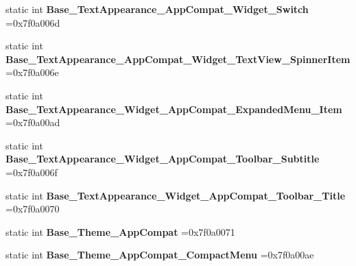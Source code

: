 \begin{DoxyCompactItemize}
\mbox{\label{classandroid_1_1support_1_1design_1_1R_1_1style_ac03f4b4d112c2bc83e433ee62a9699e0}} 
static int {\bfseries Base\+\_\+\+Text\+Appearance\+\_\+\+App\+Compat\+\_\+\+Widget\+\_\+\+Switch} =0x7f0a006d
\item 
\mbox{\label{classandroid_1_1support_1_1design_1_1R_1_1style_a9ddf4cc16f674e4ff1e0c18e97358aa7}} 
static int {\bfseries Base\+\_\+\+Text\+Appearance\+\_\+\+App\+Compat\+\_\+\+Widget\+\_\+\+Text\+View\+\_\+\+Spinner\+Item} =0x7f0a006e
\item 
\mbox{\label{classandroid_1_1support_1_1design_1_1R_1_1style_a92b799f26600fb1b6e28343694d7f2b3}} 
static int {\bfseries Base\+\_\+\+Text\+Appearance\+\_\+\+Widget\+\_\+\+App\+Compat\+\_\+\+Expanded\+Menu\+\_\+\+Item} =0x7f0a00ad
\item 
\mbox{\label{classandroid_1_1support_1_1design_1_1R_1_1style_a8c255354b40ff0d5ced09d6ec3740bcc}} 
static int {\bfseries Base\+\_\+\+Text\+Appearance\+\_\+\+Widget\+\_\+\+App\+Compat\+\_\+\+Toolbar\+\_\+\+Subtitle} =0x7f0a006f
\item 
\mbox{\label{classandroid_1_1support_1_1design_1_1R_1_1style_ae0c6f9a5c2230a216e77afafde47ae58}} 
static int {\bfseries Base\+\_\+\+Text\+Appearance\+\_\+\+Widget\+\_\+\+App\+Compat\+\_\+\+Toolbar\+\_\+\+Title} =0x7f0a0070
\item 
\mbox{\label{classandroid_1_1support_1_1design_1_1R_1_1style_a30048b2a6880d0b3e9bb1e202eb9eaf5}} 
static int {\bfseries Base\+\_\+\+Theme\+\_\+\+App\+Compat} =0x7f0a0071
\item 
\mbox{\label{classandroid_1_1support_1_1design_1_1R_1_1style_ac9c500e089f7c309b9557c692c3e7782}} 
static int {\bfseries Base\+\_\+\+Theme\+\_\+\+App\+Compat\+\_\+\+Compact\+Menu} =0x7f0a00ae
\item 
\mbox{\label{classandroid_1_1support_1_1design_1_1R_1_1style_a35f74286816917d7439eef021c7c2d15}} 

\end{DoxyCompactItemize}
